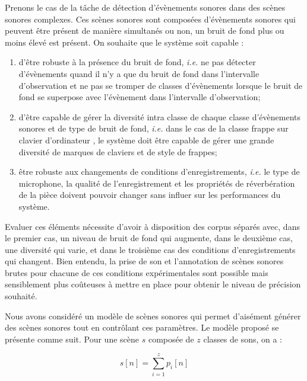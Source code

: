   Prenons le cas de la tâche de détection d'évènements sonores dans des scènes sonores complexes. Ces scènes sonores sont composées d'évènements sonores qui peuvent être présent de manière simultanés ou non, un bruit de fond plus ou moins élevé est présent. On souhaite que le système soit capable :
  \begin{enumerate}
    \item d'être robuste à la présence du bruit de fond, \textit{i.e.} ne pas détecter d'évènements quand il n'y a que du bruit de fond dans l'intervalle d'observation et ne pas se tromper de classes d'évènements lorsque le bruit de fond se superpose avec l'évènement  dans l'intervalle d'observation;
    \item d'être capable de gérer la diversité intra classe de chaque classe d'évènements sonores et de type de bruit de fond,  \textit{i.e.} dans le cas de la classe \og frappe sur clavier d'ordinateur \fg, le système doit être capable de gérer une grande diversité de marques de claviers et de style de frappes;
    \item être robuste aux changements de conditions d'enregistrements,  \textit{i.e.} le type de microphone, la qualité de l'enregistrement et les propriétés de réverbération de la pièce doivent pouvoir changer sans influer sur les performances du système.
  \end{enumerate}

  Evaluer ces éléments nécessite d'avoir à disposition des corpus séparés avec, dans le premier cas, un niveau de bruit de fond qui augmente, dans le deuxième cas, une diversité qui varie, et dans le troisième cas des conditions d'enregistrements qui changent. Bien entendu, la prise de son et l'annotation de scènes sonores brutes pour chacune de ces conditions expérimentales sont possible mais sensiblement plus coûteuses à mettre en place pour obtenir le niveau de précision souhaité.


  Nous avons considéré un modèle de scènes sonores qui permet d'aisément générer des scènes sonores tout en contrôlant ces paramètres. Le modèle proposé se présente comme suit. Pour une scène $s$ composée de $z$ classes de sons, on a :

  \begin{equation}
    s[n]=\sum_{i=1}^{z}p_i[n]
  \end{equation}

